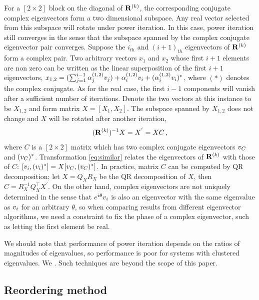 \documentclass[final,leqno,onefignum,onetabnum]{siamltexmm}
\begin{document}
For a $[2\!\times\! 2]$ block on the diagonal of $\mathbf{R}^{(k)}$, the
corresponding conjugate complex eigenvectors form a two dimensional subspace.
Any real vector selected from this subspace will rotate under power
iteration. In this case, power iteration still converges in the sense
that the subspace spanned by the complex
conjugate eigenvector pair converges.
Suppose the $i_{th}$ and $(i+1)_{th}$ eigenvectors of $\mathbf{R}^{(k)}$ form a
complex pair. Two arbitrary vectors $x_{1}$ and $x_{2}$ whose first $i+1$
elements are non zero can be written as the linear superposition of the
first $i+1$ eigenvectors,
$x_{1,2}=(\sum_{j=1}^{i-1}\alpha^{(1,2)}_{j}v_{j})+\alpha^{(1,2)}_{i}v_{i}+
(\alpha^{(1,2)}_{i}v_{i})^{*}
$,
where $(*)$ denotes the complex conjugate. As for the real case, the
first $i\!-\!1$ components will vanish after a sufficient number of
iterations. Denote the two vectors at this instance to be $X_{1, 2}$
and form matrix $X=[X_{1},X_{2}]$.
The subspace spanned by $X_{1,2}$ does not change and $X$ will be rotated
after another iteration,
\begin{equation}
(\ps{R}{k})^{-1}X=X^{'}=XC
\,,
\label{eq:similar}
\end{equation}
where $C$ is a $[2\!\times\! 2]$ matrix which has two complex conjugate
eigenvectors $v_{C}$ and $(v_{C})^{*}$. Transformation
\eqref{eq:similar} relates the eigenvectors of $\mathbf{R}^{(k)}$ with those of
$C$: $[v_{i},(v_{i})^{*}]=X[v_{C},(v_{C})^{*}]$.
In practice, matrix $C$ can be computed by QR decomposition; let
$X=Q_{X}R_{X}$ be the QR decomposition of $X$, then
$C=R_{X}^{-1}Q_{X}^\top X^{'}$.
On the other hand,
complex eigenvectors are not uniquely determined in the sense that
$e^{i\theta}v_{i}$ is also an eigenvector with the same eigenvalue
as $v_{i}$ for an arbitrary  $\theta$, so when comparing
results from different eigenvector algorithms, we need a constraint to
fix the phase of a complex eigenvector, such as letting the first element
be real.

We should note that performance of power iteration depends on the ratios
of magnitudes of eigenvalues, so performance is poor for systems with
clustered eigenvalues. We .
Such techniques are beyond the scope of this paper.

\subsection{Reordering method}
\label{sect:reorder}
\end{document}
